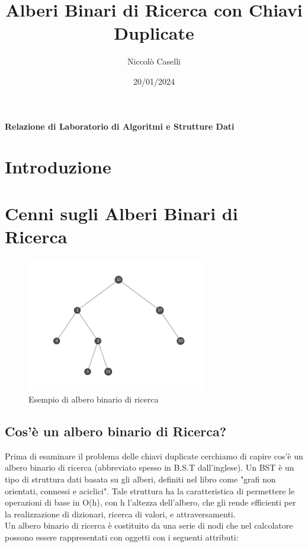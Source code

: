 \documentclass{article}
\title{Alberi Binari di Ricerca con Chiavi Duplicate}
\author{Niccolò Caselli}
\date{20/01/2024}
\begin{document}
\begin{titlepage}
  \maketitle
  \vspace*{\fill}
  \begin{center}
    \textbf{Relazione di Laboratorio di Algoritmi e Strutture Dati}
  \end{center}
  \vspace*{\fill}
\end{titlepage}


\renewcommand{\contentsname}{Indice} %
\tableofcontents
\newpage

\section{Introduzione}
\lipsum[1]


\section{Cenni sugli Alberi Binari di Ricerca}

\begin{figure}[H]
  \centering
  \includegraphics[width=0.7\textwidth]{./images/bst-generic}
  \caption{Esempio di albero binario di ricerca}
  \label{fig:bst-generic}
\end{figure}


\subsection{Cos'è un albero binario di Ricerca?}
\label{subsec:bst-introduction}
Prima di esaminare il problema delle chiavi duplicate cerchiamo di capire cos'è un albero binario di ricerca (abbreviato spesso in B.S.T dall'inglese).
Un BST è un tipo di struttura dati basata su gli alberi, definiti nel libro  \emph{} come "grafi non orientati, connessi e aciclici".
Tale struttura ha la caratteristica di permettere le operazioni di base in O(h), con h l'altezza dell'albero, che gli rende efficienti per la realizzazione di dizionari, ricerca di valori, e attraversamenti. \\
Un albero binario di ricerca è costituito da una serie di nodi che nel calcolatore possono essere rappresentati con oggetti con i seguenti attributi:
\end{document}

